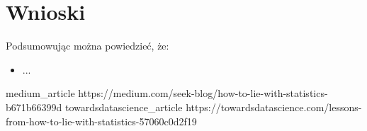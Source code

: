 \documentclass{classrep}
\begin{document}
    \section{Wnioski} {
        Podsumowując można powiedzieć, że:
        \begin{itemize}
            \item ...

        \end{itemize}
    }

    \begin{thebibliography}{0}
        \bibitem
        {medium_article}
        {https://medium.com/seek-blog/how-to-lie-with-statistics-b671b66399d}
        \bibitem
        {towardsdatascience_article}
        {https://towardsdatascience.com/lessons-from-how-to-lie-with-statistics-57060c0d2f19}
    \end{thebibliography}
\end{document}
